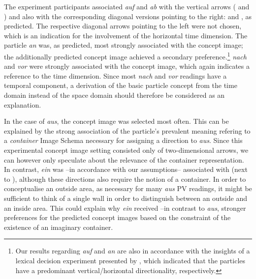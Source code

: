 \documentclass[output=paper]{langsci/langscibook}
\begin{document}
The experiment participants associated \textit{auf} and \textit{ab}
with the vertical arrows ( and ) and
also with the corresponding diagonal versions pointing to the right:
 and , as predicted. The
respective diagonal arrows pointing to the left were not chosen, which
is an indication for the involvement of the horizontal time dimension.
%
The particle \textit{an} was, as predicted, most strongly associated
with the  concept image; the additionally predicted
 concept image achieved a secondary preference.\footnote{Our
  results regarding \textit{auf} and \textit{an} are also in
  accordance with the insights of a lexical decision experiment
  presented by \cite{FrassinelliEtAl:17}, which indicated that the
  particles have a predominant vertical/horizontal directionality,
  respectively.}
%
\textit{nach} and \textit{vor} were strongly associated with the
 concept image, which again indicates a reference to the time
dimension. Since most \textit{nach} and \textit{vor} readings have a
temporal component, a derivation of the basic particle concept from
the time domain instead of the space domain should therefore be
considered as an explanation.

In the case of \textit{aus}, the  concept image was selected
most often. This can be explained by the strong association of the
particle's prevalent meaning refering to a \textit{container} Image
Schema necessary for assigning a direction to \textit{aus}. Since this
experimental concept image setting consisted only of two-dimensional arrows, we
can however only speculate about the relevance of the container
representation. In contrast, \textit{ein} was --in accordance with our
assumptions-- associated with  (next to
), although these directions also require the notion
of a container. In order to conceptualise an outside area, as
necessary for many \textit{aus} PV readings, it might be sufficient to
think of a single wall in order to distinguish between an outside and
an inside area. This could explain why \textit{ein} received --in
contrast to \textit{aus}, stronger preferences for the predicted concept images
based on the constraint of the existence of an imaginary container.
\end{document}
